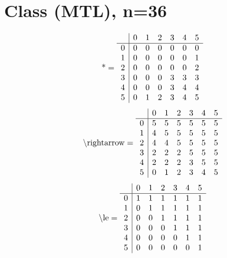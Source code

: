 \documentclass[11pt]{article}
\begin{document}
\section{Class (MTL), n=36}
\[\text{*} = 
\begin{array}{r | r r r r r r}
 & 0 & 1 & 2 & 3 & 4 & 5 \\ \hline
0 & 0 & 0 & 0 & 0 & 0 & 0 \\
1 & 0 & 0 & 0 & 0 & 0 & 1 \\
2 & 0 & 0 & 0 & 0 & 0 & 2 \\
3 & 0 & 0 & 0 & 3 & 3 & 3 \\
4 & 0 & 0 & 0 & 3 & 4 & 4 \\
5 & 0 & 1 & 2 & 3 & 4 & 5 \\
\end{array}
\]
\[\text{\textbackslash rightarrow} = 
\begin{array}{r | r r r r r r}
 & 0 & 1 & 2 & 3 & 4 & 5 \\ \hline
0 & 5 & 5 & 5 & 5 & 5 & 5 \\
1 & 4 & 5 & 5 & 5 & 5 & 5 \\
2 & 4 & 4 & 5 & 5 & 5 & 5 \\
3 & 2 & 2 & 2 & 5 & 5 & 5 \\
4 & 2 & 2 & 2 & 3 & 5 & 5 \\
5 & 0 & 1 & 2 & 3 & 4 & 5 \\
\end{array}
\]
\[\text{\textbackslash le} = 
\begin{array}{r | r r r r r r}
 & 0 & 1 & 2 & 3 & 4 & 5 \\ \hline
0 & 1 & 1 & 1 & 1 & 1 & 1 \\
1 & 0 & 1 & 1 & 1 & 1 & 1 \\
2 & 0 & 0 & 1 & 1 & 1 & 1 \\
3 & 0 & 0 & 0 & 1 & 1 & 1 \\
4 & 0 & 0 & 0 & 0 & 1 & 1 \\
5 & 0 & 0 & 0 & 0 & 0 & 1 \\
\end{array}
\]
\end{document}

